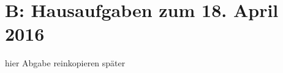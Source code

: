 \documentclass[12pt,a4paper]{scrreprt}
\begin{document}
\section*{B: Hausaufgaben zum 18. April 2016}

hier Abgabe reinkopieren später

%
%
%
%
%
%
%
\end{document}
